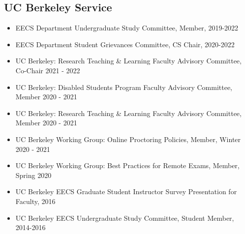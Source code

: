 \vspace{10pt}

\subsection{UC Berkeley Service}

\vspace{6pt}

\begin{itemize}

  \setlength\itemsep{1em}

    \item{EECS Department Undergraduate Study Committee, Member, 2019-2022}
    
    \item{EECS Department Student Grievances Committee, CS Chair, 2020-2022}

    \item{UC Berkeley: Research Teaching \& Learning Faculty Advisory Committee, Co-Chair 2021 - 2022}
    
    \item{UC Berkeley: Disabled Students Program Faculty Advisory Committee, Member 2020 - 2021}
    
    \item{UC Berkeley: Research Teaching & Learning Faculty Advisory Committee, Member 2020 - 2021}
    
    \item{UC Berkeley Working Group: Online Proctoring Policies, Member, Winter 2020 - 2021}
    
    \item{UC Berkeley Working Group: Best Practices for Remote Exams, Member, Spring 2020}
    
    \item{UC Berkeley EECS Graduate Student Instructor Survey Presentation for Faculty, 2016}
   
    \item{UC Berkeley EECS Undergraduate Study Committee, Student Member, 2014-2016}
   
\end{itemize}

\vspace{3pt}
